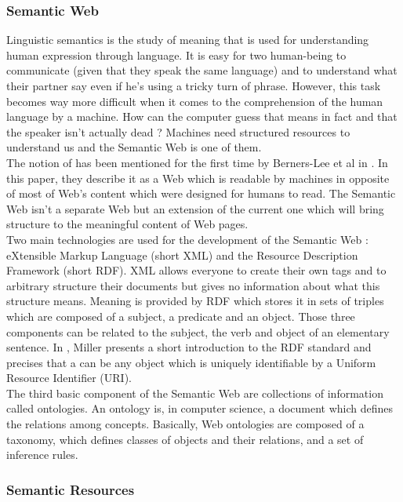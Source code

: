 \subsubsection{Semantic Web} %
\label{ssub:semantic_web}
Linguistic semantics is the study of meaning that is used for understanding human expression through language. It is easy for two human-being to communicate (given that they speak the same language) and to understand what their partner say even if he's using a tricky turn of phrase. However, this task becomes way more difficult when it comes to the comprehension of the human language by a machine. How can the computer guess that  means in fact  and that the speaker isn't actually dead ? Machines need structured resources to understand us and the Semantic Web is one of them.\\
The notion of  has been mentioned for the first time by Berners-Lee et al in \cite{berners}. In this paper, they describe it as a Web which is readable by machines in opposite of most of Web's content which were designed for humans to read. The Semantic Web isn't a separate Web but an extension of the current one which will bring structure to the meaningful content of Web pages.\\
Two main technologies are used for the development of the Semantic Web : eXtensible Markup Language (short XML) and the Resource Description Framework (short RDF). XML allows everyone to create their own tags and to arbitrary structure their documents but gives no information about what this structure means. Meaning is provided by RDF which stores it in sets of triples which are composed of a subject, a predicate and an object. Those three components can be related to the subject, the verb and object of an elementary sentence. In \cite{miller}, Miller presents a short introduction to the RDF standard and precises that a  can be any object which is uniquely identifiable by a Uniform Resource Identifier (URI).\\
The third basic component of the Semantic Web are collections of information called ontologies. An ontology is, in computer science, a document which defines the relations among concepts. Basically, Web ontologies are composed of a taxonomy, which defines classes of objects and their relations, and a set of inference rules.

\subsubsection{Semantic Resources} %
\label{ssub:semantic_resources}
